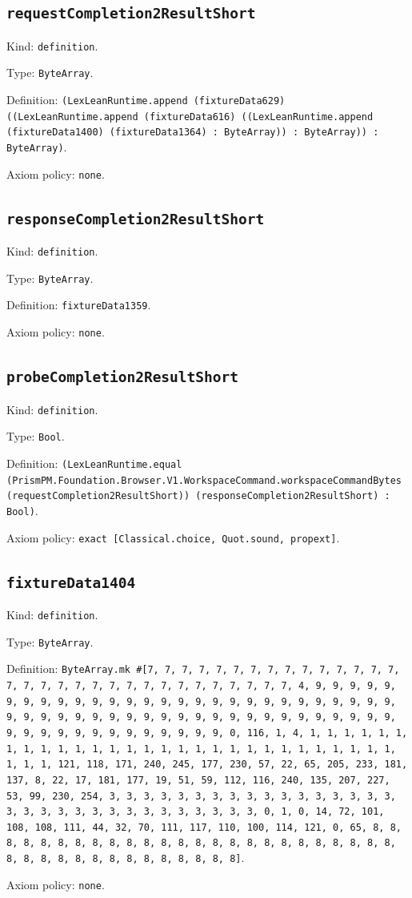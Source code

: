 \documentclass[11pt]{article}
\begin{document}
\subsection*{\texttt{requestCompletion2ResultShort}}
\noindent Kind: \texttt{definition}.\par
\noindent Type: \texttt{ByteArray}.\par
\noindent Definition: \texttt{(LexLeanRuntime.append (fixtureData629) ((LexLeanRuntime.append (fixtureData616) ((LexLeanRuntime.append (fixtureData1400) (fixtureData1364) : ByteArray)) : ByteArray)) : ByteArray)}.\par
\noindent Axiom policy: \texttt{none}.\par
\subsection*{\texttt{responseCompletion2ResultShort}}
\noindent Kind: \texttt{definition}.\par
\noindent Type: \texttt{ByteArray}.\par
\noindent Definition: \texttt{fixtureData1359}.\par
\noindent Axiom policy: \texttt{none}.\par
\subsection*{\texttt{probeCompletion2ResultShort}}
\noindent Kind: \texttt{definition}.\par
\noindent Type: \texttt{Bool}.\par
\noindent Definition: \texttt{(LexLeanRuntime.equal (PrismPM.Foundation.Browser.V1.WorkspaceCommand.workspaceCommandBytes (requestCompletion2ResultShort)) (responseCompletion2ResultShort) : Bool)}.\par
\noindent Axiom policy: \texttt{exact [Classical.choice, Quot.sound, propext]}.\par
\subsection*{\texttt{fixtureData1404}}
\noindent Kind: \texttt{definition}.\par
\noindent Type: \texttt{ByteArray}.\par
\noindent Definition: \texttt{ByteArray.mk \#[7, 7, 7, 7, 7, 7, 7, 7, 7, 7, 7, 7, 7, 7, 7, 7, 7, 7, 7, 7, 7, 7, 7, 7, 7, 7, 7, 7, 7, 7, 7, 7, 4, 9, 9, 9, 9, 9, 9, 9, 9, 9, 9, 9, 9, 9, 9, 9, 9, 9, 9, 9, 9, 9, 9, 9, 9, 9, 9, 9, 9, 9, 9, 9, 9, 9, 9, 9, 9, 9, 9, 9, 9, 9, 9, 9, 9, 9, 9, 9, 9, 9, 9, 9, 9, 9, 9, 9, 9, 9, 9, 9, 9, 9, 9, 9, 9, 0, 116, 1, 4, 1, 1, 1, 1, 1, 1, 1, 1, 1, 1, 1, 1, 1, 1, 1, 1, 1, 1, 1, 1, 1, 1, 1, 1, 1, 1, 1, 1, 1, 1, 1, 1, 121, 118, 171, 240, 245, 177, 230, 57, 22, 65, 205, 233, 181, 137, 8, 22, 17, 181, 177, 19, 51, 59, 112, 116, 240, 135, 207, 227, 53, 99, 230, 254, 3, 3, 3, 3, 3, 3, 3, 3, 3, 3, 3, 3, 3, 3, 3, 3, 3, 3, 3, 3, 3, 3, 3, 3, 3, 3, 3, 3, 3, 3, 3, 3, 0, 1, 0, 14, 72, 101, 108, 108, 111, 44, 32, 70, 111, 117, 110, 100, 114, 121, 0, 65, 8, 8, 8, 8, 8, 8, 8, 8, 8, 8, 8, 8, 8, 8, 8, 8, 8, 8, 8, 8, 8, 8, 8, 8, 8, 8, 8, 8, 8, 8, 8, 8, 8, 8, 8, 8, 8, 8, 8]}.\par
\noindent Axiom policy: \texttt{none}.\par
\end{document}
